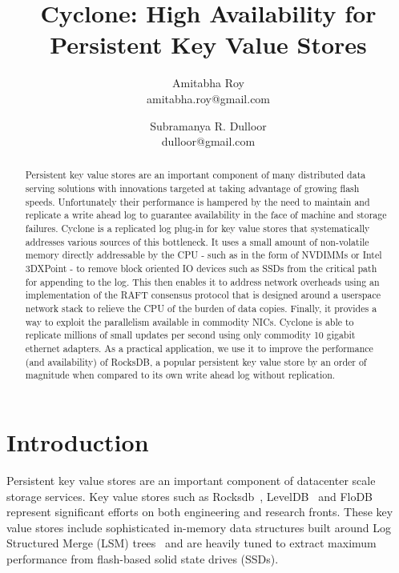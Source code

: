 \documentclass[letterpaper,twocolumn,10pt]{article}
\begin{document}
\title{Cyclone: High Availability for Persistent Key Value Stores}

\author{{\rm Amitabha Roy} \\ amitabha.roy@gmail.com 
	     \and {\rm Subramanya R. Dulloor} \\ dulloor@gmail.com}

\date{}
\maketitle


\begin{abstract}
\vspace{0.05in}
Persistent key value stores are an important component of many
distributed data serving solutions with innovations targeted at taking
advantage of growing flash speeds. Unfortunately their performance is
hampered by the need to maintain and replicate a write ahead log to
guarantee availability in the face of machine and storage
failures. Cyclone is a replicated log plug-in for key value stores
that systematically addresses various sources of this bottleneck. It
uses a small amount of non-volatile memory directly addressable by the
CPU - such as in the form of NVDIMMs or Intel 3DXPoint - to remove
block oriented IO devices such as SSDs from the critical path for
appending to the log. This then enables it to address network
overheads using an implementation of the RAFT consensus protocol that
is designed around a userspace network stack to relieve the CPU of the
burden of data copies.  Finally, it provides a way to exploit the
parallelism available in commodity NICs.  Cyclone is able to replicate
millions of small updates per second using only commodity 10 gigabit
ethernet adapters. As a practical application, we use it to improve
the performance (and availability) of RocksDB, a popular persistent
key value store by an order of magnitude when compared to its own
write ahead log without replication.
\end{abstract}

\section{Introduction}
Persistent key value stores are an important component of datacenter scale
storage services. Key value stores such as Rocksdb~\cite{rocksdb},
LevelDB~\cite{leveldb} and FloDB~\cite{flodb} represent significant efforts on
both engineering and research fronts. These key value stores include
sophisticated in-memory data structures built around Log Structured Merge (LSM)
trees~\cite{lsmtree} and are heavily tuned to extract maximum performance from
flash-based solid state drives (SSDs).
\end{document}

